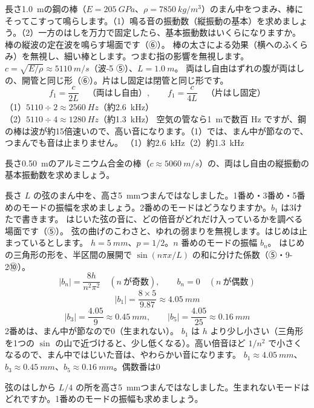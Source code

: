 \label{ph:波-6:ex6}
\begin{phreidai}[鳴る金属の棒]
長さ\qty{1.0}{m}の鋼の棒（$E=\qty{205}{GPa}$、$\rho=\qty{7850}{kg/m^3}$）のまん中をつまみ、棒にそってこすって鳴らします。（1）鳴る音の振動数（縦振動の基本）を求めましょう。（2）一方のはしを万力で固定したら、基本振動数はいくらになりますか。
\phbamen
棒の縦波の定在波を鳴らす場面です（⑥）。
\phmushi
棒の太さによる効果（横へのふくらみ）を無視し、細い棒とします。つまむ指の影響を無視します。
\phzu
$c=\sqrt{E/\rho}\approx\qty{5110}{m/s}$（波-5 ⑤）、$L=\qty{1.0}{m}$。
\phriyu
両はし自由はずれの腹が両はしの、開管と同じ形（⑥）。片はし固定は閉管と同じ形です。
\phtateru
\[f_1=\frac{c}{2L}\quad\text{（両はし自由）},\qquad f_1=\frac{c}{4L}\quad\text{（片はし固定）}\]
\phtoku
（1）$5110\div2\approx\qty{2560}{Hz}$（約\qty{2.6}{kHz}）\\
（2）$5110\div4\approx\qty{1280}{Hz}$（約\qty{1.3}{kHz}）
\phtashikame
空気の管なら\qty{1}{m}で数百 Hz ですが、鋼の棒は波が約15倍速いので、高い音になります。（1）では、まん中が節なので、つまんでも音は止まりません。
\kotae （1）約\qty{2.6}{kHz}（2）約\qty{1.3}{kHz}
\end{phreidai}
\begin{jibun}
長さ\qty{0.50}{m}のアルミニウム合金の棒（$c\approx\qty{5060}{m/s}$）の、両はし自由の縦振動の基本振動数を求めましょう。
\end{jibun}

\label{ph:波-6:ex7}
\begin{phreidai}[まん中ではじいた弦の倍音]
長さ $L$ の弦のまん中を、高さ\qty{5}{mm}つまんではなしました。1番め・3番め・5番めのモードの振幅を求めましょう。2番めのモードはどうなりますか。$b_1$ は3けたで書きます。
\phbamen
はじいた弦の音に、どの倍音がどれだけ入っているかを調べる場面です（⑤）。
\phmushi
弦の曲げのこわさと、ゆれの弱まりを無視します。はじめは止まっているとします。
\phzu
$h=\qty{5}{mm}$、$p=1/2$。$n$ 番めのモードの振幅 $b_n$。
\phriyu
はじめの三角形の形を、半区間の展開で $\sin(n\pi x/L)$ の和に分けた係数（⑤・9-2⑩）。
\phtateru
\[|b_n|=\frac{8h}{n^2\pi^2}\quad(n\ \text{が奇数}),\qquad b_n=0\quad(n\ \text{が偶数})\]
\phtoku
\[|b_1|=\frac{8\times5}{9.87}\approx\qty{4.05}{mm}\]
\[|b_3|=\frac{4.05}{9}\approx\qty{0.45}{mm},\qquad|b_5|=\frac{4.05}{25}\approx\qty{0.16}{mm}\]
2番めは、まん中が節なので0（生まれない）。
\phtashikame
$b_1$ は $h$ より少し小さい（三角形を1つの $\sin$ の山で近づけると、少し低くなる）。高い倍音ほど $1/n^2$ で小さくなるので、まん中ではじいた音は、やわらかい音になります。
\kotae $b_1\approx\qty{4.05}{mm}$、$b_3\approx\qty{0.45}{mm}$、$b_5\approx\qty{0.16}{mm}$。偶数番は0
\end{phreidai}
\begin{jibun}
弦のはしから $L/4$ の所を高さ\qty{5}{mm}つまんではなしました。生まれないモードはどれですか。1番めのモードの振幅も求めましょう。
\end{jibun}

